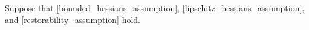 Suppose that \cref{bounded_hessians_assumption}, \cref{lipschitz_hessians_assumption}, and \cref{restorability_assumption} hold.
